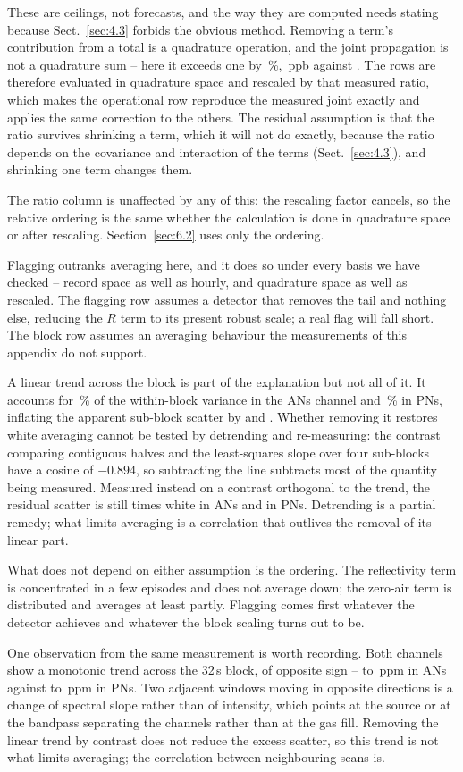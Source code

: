 These are ceilings, not forecasts, and the way they are computed needs stating
because Sect.~\ref{sec:4.3} forbids the obvious method. Removing a term's contribution from a
total is a quadrature operation, and the joint propagation is not a quadrature
sum -- here it exceeds one by \,\%, \,ppb against . The rows are
therefore evaluated in quadrature space and rescaled by that measured ratio,
which makes the operational row reproduce the measured joint exactly and
applies the same correction to the others. The residual assumption is that the
ratio survives shrinking a term, which it will not do exactly, because the
ratio depends on the covariance and interaction of the terms (Sect.~\ref{sec:4.3}), and shrinking one
term changes them.

The ratio column is unaffected by any of this: the rescaling factor cancels,
so the relative ordering is the same whether the calculation is done in
quadrature space or after rescaling. Section~\ref{sec:6.2} uses only the ordering.

Flagging outranks averaging here, and it does so under every basis we have
checked -- record space as well as hourly, and quadrature space as well as
rescaled. The flagging row assumes a detector that
removes the tail and nothing else, reducing the $R$ term to its present robust
scale; a real flag will fall short. The block row assumes an averaging
behaviour the measurements of this appendix do not support.

A linear trend across the block is part of the explanation but not all of it.
It accounts for \,\% of the within-block variance in the ANs channel and \,\%
in PNs, inflating the apparent sub-block scatter by  and . Whether
removing it restores white averaging cannot be tested by detrending and
re-measuring: the contrast comparing contiguous halves and the least-squares
slope over four sub-blocks have a cosine of $-0.894$, so subtracting the line
subtracts most of the quantity being measured. Measured instead on a contrast
orthogonal to the trend, the residual scatter is still  times white in ANs
and  in PNs. Detrending is a partial remedy; what limits averaging is a
correlation that outlives the removal of its linear part.

What does not depend on either assumption is the ordering. The reflectivity
term is concentrated in a few episodes and does not average down; the zero-air
term is distributed and averages at least partly. Flagging comes first
whatever the detector achieves and whatever the block scaling turns out to be.

One observation from the same measurement is worth recording. Both channels
show a monotonic trend across the 32\,s block, of opposite sign --  to
\,ppm in ANs against  to \,ppm in PNs. Two adjacent windows
moving in opposite directions is a change of spectral slope rather than of
intensity, which points at the source or at the bandpass separating the
channels rather than at the gas fill. Removing the linear trend by contrast
does not reduce the excess scatter, so this trend is not what limits
averaging; the correlation between neighbouring scans is.
